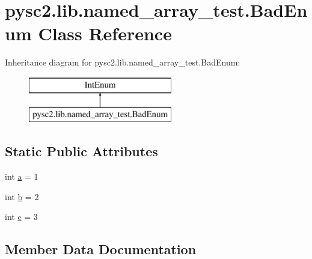 \hypertarget{classpysc2_1_1lib_1_1named__array__test_1_1_bad_enum}{}\section{pysc2.\+lib.\+named\+\_\+array\+\_\+test.\+Bad\+Enum Class Reference}
\label{classpysc2_1_1lib_1_1named__array__test_1_1_bad_enum}
Inheritance diagram for pysc2.\+lib.\+named\+\_\+array\+\_\+test.\+Bad\+Enum\+:\begin{figure}[H]
\begin{center}
\leavevmode
\includegraphics[height=2.000000cm]{classpysc2_1_1lib_1_1named__array__test_1_1_bad_enum}
\end{center}
\end{figure}
\subsection*{Static Public Attributes}
\begin{DoxyCompactItemize}
\item 
int \mbox{\hyperlink{classpysc2_1_1lib_1_1named__array__test_1_1_bad_enum_ac2011267dad627afd1b66d5974f69b4c}{a}} = 1
\item 
int \mbox{\hyperlink{classpysc2_1_1lib_1_1named__array__test_1_1_bad_enum_a39852f4bebf93c49f8043f731bf1990d}{b}} = 2
\item 
int \mbox{\hyperlink{classpysc2_1_1lib_1_1named__array__test_1_1_bad_enum_a08a980fdbdc2e50c68ccf8db768948f6}{c}} = 3
\end{DoxyCompactItemize}


\subsection{Member Data Documentation}
\mbox{\label{classpysc2_1_1lib_1_1named__array__test_1_1_bad_enum_ac2011267dad627afd1b66d5974f69b4c}} 
